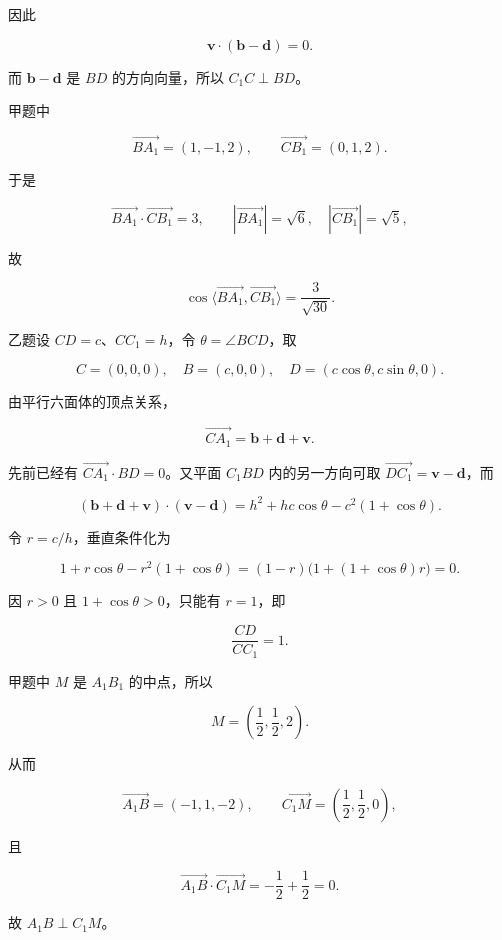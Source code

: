 \begin{answer}
因此

\nopagebreak[4]
\[
\mathbf v\cdot(\mathbf b-\mathbf d)=0.
\]

而 $\mathbf b-\mathbf d$ 是 $BD$ 的方向向量，所以 $C_1C\perp BD$。


甲题中

\nopagebreak[4]
\[
\overrightarrow{BA_1}=(1,-1,2),\qquad
\overrightarrow{CB_1}=(0,1,2).
\]

于是

\nopagebreak[4]
\[
\overrightarrow{BA_1}\cdot\overrightarrow{CB_1}=3,
\qquad
|\overrightarrow{BA_1}|=\sqrt6,\quad
|\overrightarrow{CB_1}|=\sqrt5,
\]

故

\nopagebreak[4]
\[
\cos\langle\overrightarrow{BA_1},\overrightarrow{CB_1}\rangle
=\frac3{\sqrt{30}}.
\]

乙题设 $CD=c$、$CC_1=h$，令 $\theta=\angle BCD$，取

\nopagebreak[4]
\[
C=(0,0,0),\quad B=(c,0,0),\quad
D=(c\cos\theta,c\sin\theta,0).
\]

由平行六面体的顶点关系，

\nopagebreak[4]
\[
\overrightarrow{CA_1}=\mathbf b+\mathbf d+\mathbf v.
\]

先前已经有 $\overrightarrow{CA_1}\cdot BD=0$。又平面 $C_1BD$ 内的另一方向可取 $\overrightarrow{DC_1}=\mathbf v-\mathbf d$，而

\nopagebreak[4]
\[
(\mathbf b+\mathbf d+\mathbf v)\cdot(\mathbf v-\mathbf d)
=h^2+hc\cos\theta-c^2(1+\cos\theta).
\]

令 $r=c/h$，垂直条件化为

\nopagebreak[4]
\[
1+r\cos\theta-r^2(1+\cos\theta)
=(1-r)\bigl(1+(1+\cos\theta)r\bigr)=0.
\]

因 $r>0$ 且 $1+\cos\theta>0$，只能有 $r=1$，即

\nopagebreak[4]
\[
\frac{CD}{CC_1}=1.
\]


甲题中 $M$ 是 $A_1B_1$ 的中点，所以

\nopagebreak[4]
\[
M=\left(\frac12,\frac12,2\right).
\]

从而

\nopagebreak[4]
\[
\overrightarrow{A_1B}=(-1,1,-2),\qquad
\overrightarrow{C_1M}=\left(\frac12,\frac12,0\right),
\]

且

\nopagebreak[4]
\[
\overrightarrow{A_1B}\cdot\overrightarrow{C_1M}
=-\frac12+\frac12=0.
\]

故 $A_1B\perp C_1M$。




\end{answer}
